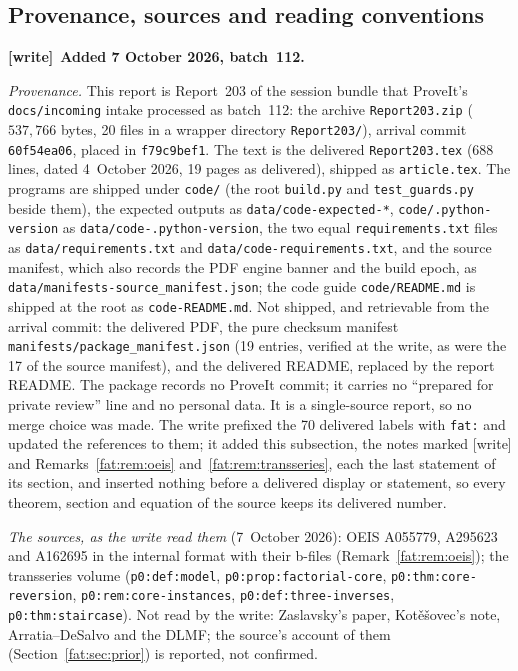 \documentclass[11pt,letterpaper]{article}
\numberwithin{equation}{section}
\newcommand{\file}[1]{\nolinkurl{#1}}
\newenvironment{writenote}[1][]{\par\smallskip\begingroup\small
 \noindent\textbf{[write]}\if\relax\detokenize{#1}\relax\else~\textbf{#1.}\fi\ }%
 {\par\endgroup\smallskip}
\theoremstyle{remark}\newtheorem{remark}[theorem]{Remark}
\begin{document}
\subsection{Provenance, sources and reading conventions}\label{fat:sec:provenance}
\begin{writenote}[Added 7 October 2026, batch~112]\raggedright
\emph{Provenance.} This report is Report~203 of the session bundle that
ProveIt's \file{docs/incoming} intake processed as batch~112: the archive
\file{Report203.zip} ($537{,}766$ bytes, 20 files in a wrapper directory
\file{Report203/}), arrival commit \file{60f54ea06}, placed in
\file{f79c9bef1}. The text is the delivered \file{Report203.tex} (688 lines,
dated 4~October 2026, 19 pages as delivered), shipped as \file{article.tex}.
The programs are shipped under \file{code/} (the root \file{build.py} and
\file{test_guards.py} beside them), the expected outputs as
\file{data/code-expected-*}, \file{code/.python-version} as
\file{data/code-.python-version}, the two equal \file{requirements.txt}
files as \file{data/requirements.txt} and \file{data/code-requirements.txt},
and the source manifest, which also records the PDF engine banner and the
build epoch, as \file{data/manifests-source_manifest.json}; the code guide
\file{code/README.md} is shipped at the root as \file{code-README.md}. Not
shipped, and retrievable from the arrival commit: the delivered PDF, the pure
checksum manifest \file{manifests/package_manifest.json} (19 entries,
verified at the write, as were the 17 of the source manifest), and the
delivered README, replaced by the report README. The package records no
ProveIt commit; it carries no ``prepared for private review'' line and no
personal data. It is a single-source report, so no merge choice was made.
The write prefixed the 70 delivered labels with \file{fat:} and updated the
references to them; it added this subsection, the notes marked [write] and
Remarks~\ref{fat:rem:oeis} and~\ref{fat:rem:transseries}, each the last
statement of its section, and inserted nothing before a delivered display or
statement, so every theorem, section and equation of the source keeps its
delivered number.

\emph{The sources, as the write read them} (7~October 2026): OEIS A055779,
A295623 and A162695 in the internal format with their b-files
(Remark~\ref{fat:rem:oeis}); the transseries volume
(\file{p0:def:model}, \file{p0:prop:factorial-core},
\file{p0:thm:core-reversion}, \file{p0:rem:core-instances},
\file{p0:def:three-inverses}, \file{p0:thm:staircase}). Not read by the
write: Zaslavsky's paper, Kot\v{e}\v{s}ovec's note, Arratia--DeSalvo and the
DLMF; the source's account of them (Section~\ref{fat:sec:prior}) is
reported, not confirmed.


\end{writenote}
\end{document}
